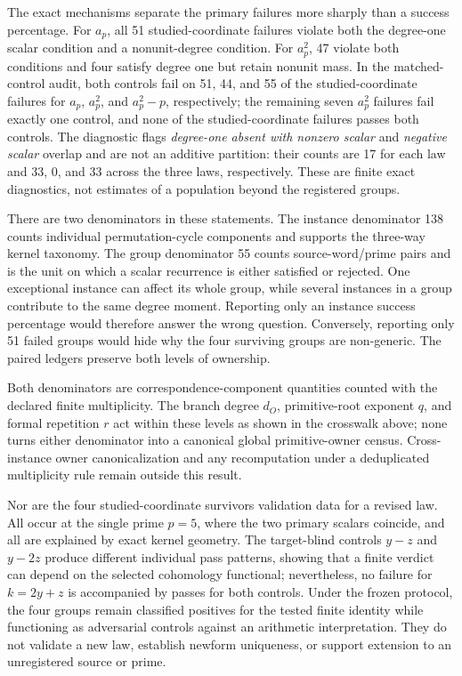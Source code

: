 \documentclass[11pt]{article}
\theoremstyle{definition}
\theoremstyle{remark}
\begin{document}
The exact mechanisms separate the primary failures more sharply than a success percentage. For $a_p$, all 51 studied-coordinate failures violate both the degree-one scalar condition and a nonunit-degree condition. For $a_p^2$, 47 violate both conditions and four satisfy degree one but retain nonunit mass. In the matched-control audit, both controls fail on 51, 44, and 55 of the studied-coordinate failures for $a_p$, $a_p^2$, and $a_p^2-p$, respectively; the remaining seven $a_p^2$ failures fail exactly one control, and none of the studied-coordinate failures passes both controls. The diagnostic flags \emph{degree-one absent with nonzero scalar} and \emph{negative scalar} overlap and are not an additive partition: their counts are 17 for each law and 33, 0, and 33 across the three laws, respectively. These are finite exact diagnostics, not estimates of a population beyond the registered groups.

There are two denominators in these statements. The instance denominator 138 counts individual permutation-cycle components and supports the three-way kernel taxonomy. The group denominator 55 counts source-word/prime pairs and is the unit on which a scalar recurrence is either satisfied or rejected. One exceptional instance can affect its whole group, while several instances in a group contribute to the same degree moment. Reporting only an instance success percentage would therefore answer the wrong question. Conversely, reporting only 51 failed groups would hide why the four surviving groups are non-generic. The paired ledgers preserve both levels of ownership.

Both denominators are correspondence-component quantities counted with the declared finite multiplicity. The branch degree $d_O$, primitive-root exponent $q$, and formal repetition $r$ act within these levels as shown in the crosswalk above; none turns either denominator into a canonical global primitive-owner census. Cross-instance owner canonicalization and any recomputation under a deduplicated multiplicity rule remain outside this result.

Nor are the four studied-coordinate survivors validation data for a revised law. All occur at the single prime $p=5$, where the two primary scalars coincide, and all are explained by exact kernel geometry. The target-blind controls $y-z$ and $y-2z$ produce different individual pass patterns, showing that a finite verdict can depend on the selected cohomology functional; nevertheless, no failure for $k=2y+z$ is accompanied by passes for both controls. Under the frozen protocol, the four groups remain classified positives for the tested finite identity while functioning as adversarial controls against an arithmetic interpretation. They do not validate a new law, establish newform uniqueness, or support extension to an unregistered source or prime.
\end{document}
